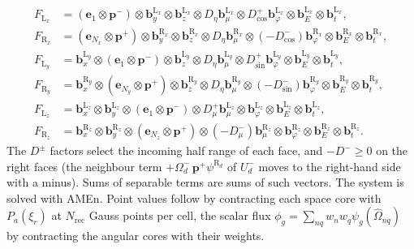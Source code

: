 \documentclass[11pt,a4paper]{article}
\newcommand{\Om}{\hat{\Omega}}
\newcommand{\kron}{\otimes}
\newcommand{\pp}{{\bm{p}^{+}}}
\newcommand{\pmn}{{\bm{p}^{-}}}
\begin{document}
\begin{equation}
\begin{aligned}
F_{\mathrm L_x}&=(\bm e_1\kron\pmn)\kron\bm b^{\mathrm L_x}_y\kron\bm b^{\mathrm L_x}_z\kron D_\eta\bm b^{\mathrm L_x}_\mu\kron D^+_{\cos}\bm b^{\mathrm L_x}_\varphi\kron\bm b^{\mathrm L_x}_E\kron\bm b^{\mathrm L_x}_t,\\
F_{\mathrm R_x}&=(\bm e_{N_x}\kron\pp)\kron\bm b^{\mathrm R_x}_y\kron\bm b^{\mathrm R_x}_z\kron D_\eta\bm b^{\mathrm R_x}_\mu\kron(-D^-_{\cos})\bm b^{\mathrm R_x}_\varphi\kron\bm b^{\mathrm R_x}_E\kron\bm b^{\mathrm R_x}_t,\\
F_{\mathrm L_y}&=\bm b^{\mathrm L_y}_x\kron(\bm e_1\kron\pmn)\kron\bm b^{\mathrm L_y}_z\kron D_\eta\bm b^{\mathrm L_y}_\mu\kron D^+_{\sin}\bm b^{\mathrm L_y}_\varphi\kron\bm b^{\mathrm L_y}_E\kron\bm b^{\mathrm L_y}_t,\\
F_{\mathrm R_y}&=\bm b^{\mathrm R_y}_x\kron(\bm e_{N_y}\kron\pp)\kron\bm b^{\mathrm R_y}_z\kron D_\eta\bm b^{\mathrm R_y}_\mu\kron(-D^-_{\sin})\bm b^{\mathrm R_y}_\varphi\kron\bm b^{\mathrm R_y}_E\kron\bm b^{\mathrm R_y}_t,\\
F_{\mathrm L_z}&=\bm b^{\mathrm L_z}_x\kron\bm b^{\mathrm L_z}_y\kron(\bm e_1\kron\pmn)\kron D^+_\mu\bm b^{\mathrm L_z}_\mu\kron\bm b^{\mathrm L_z}_\varphi\kron\bm b^{\mathrm L_z}_E\kron\bm b^{\mathrm L_z}_t,\\
F_{\mathrm R_z}&=\bm b^{\mathrm R_z}_x\kron\bm b^{\mathrm R_z}_y\kron(\bm e_{N_z}\kron\pp)\kron(-D^-_\mu)\bm b^{\mathrm R_z}_\mu\kron\bm b^{\mathrm R_z}_\varphi\kron\bm b^{\mathrm R_z}_E\kron\bm b^{\mathrm R_z}_t .
\end{aligned}
\label{eq:F-bc}
\end{equation}
The $D^\pm$ factors select the incoming half range of each face, and $-D^-\ge0$ on the right faces (the neighbour term $+\Omega^-_d\,\pp\psi^{\mathrm R_d}$ of $U^-_d$ moves to the right-hand side with a minus). Sums of separable terms are sums of such vectors. The system is solved with AMEn. Point values follow by contracting each space core with $P_a(\xi_r)$ at $N_{\mathrm{rec}}$ Gauss points per cell, the scalar flux $\phi_g=\sum_{nq}w_nw_q\psi_g(\Om_{nq})$ by contracting the angular cores with their weights.
\end{document}
